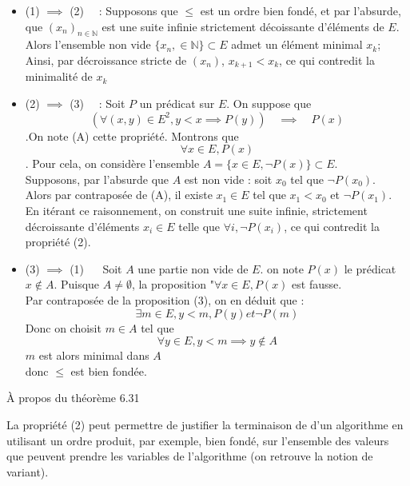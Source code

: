     \begin{demonstration}
        \begin{itemize}
            \item (1) $\implies$ (2) $\quad$: Supposons que $\leq$ est un ordre bien fondé, et par l'absurde, que $(x_n)_{n \in \mathbb{N}}$ est une suite infinie strictement décoissante d'éléments de $E$. Alors l'ensemble non vide $\{x_n, \in \mathbb{N}\} \subset E$ admet un élément minimal $x_k$; Ainsi, par décroissance stricte de $(x_n)$, $x_{k+1} < x_k$, ce qui contredit la minimalité de $x_k$
            \item (2) $\implies$ (3) $\quad$: Soit $P$ un prédicat sur $E$. On suppose que $$(\forall (x,y) \in E^2, y < x \implies P(y)) \quad \implies \quad P(x) $$.On note (A) cette propriété. Montrons que $$ \forall x \in E, P(x)$$. Pour cela, on considère l'ensemble $A = \{x \in E, \lnot P(x)\} \subset E$. \\ Supposons, par l'absurde que $A$ est non vide : soit $x_0$ tel que $\lnot P(x_0)$. \\ Alors par contraposée de (A), il existe $x_1 \in E$ tel que $x_1 < x_0$ et $\lnot P(x_1)$. \\En itérant ce raisonnement, on construit une suite infinie, strictement décroissante d'éléments $x_i \in E$ telle que $\forall i, \lnot P(x_i)$, ce qui contredit la propriété (2).
            \item (3) $\implies$ (1) $\quad$ Soit $A$ une partie non vide de $E$. on note $P(x)$ le prédicat $x \notin A$. Puisque $A \neq \emptyset$, la proposition "$\forall x \in E, P(x) $ est fausse. \\ Par contraposée de la proposition (3), on en déduit que : $$\exists m \in E, y<m, P(y) et \lnot P(m)$$ Donc on choisit $m \in A $ tel que $$\forall y \in E, y<m \implies y \notin A$$ $m$ est alors minimal dans $A$ \\ donc $\leq$ est bien fondée.
        \end{itemize}
    \end{demonstration}
    
        
        
        \begin{remarque}{6.32}{À propos du théorème 6.31}
            \item La propriété (2) peut permettre de justifier la terminaison de d'un algorithme en utilisant un ordre produit, par exemple, bien fondé, sur l'ensemble des valeurs que peuvent prendre les variables de l'algorithme (on retrouve la notion de variant).
        \end{remarque}

